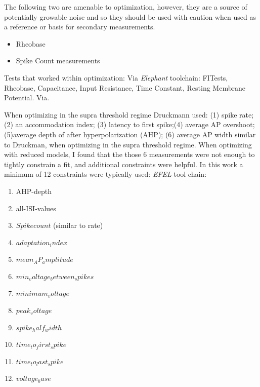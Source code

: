 The following two are amenable to optimization, however, they are a source of potentially growable noise and so they should be used with caution when used as a reference or basis for secondary measurements.
\begin{itemize}
\item Rheobase 
\item Spike Count measurements \end{itemize}



Tests that worked within optimization:
Via \emph{Elephant} toolchain: FITests, Rheobase, Capacitance, Input Resistance, Time Constant, Resting Membrane Potential.
Via. 

When optimizing in the supra threshold regime Druckmann used:
(1) spike rate; (2) an accommodation index; (3) latency to first spike;(4) average AP overshoot; (5)average depth of after hyperpolarization (AHP); 
(6) average AP width similar to Druckman, when optimizing in the supra threshold regime.
When optimizing with reduced models, I found that the those 6 measurements were not enough to tightly constrain a fit, and additional constraints were helpful. In this work a minimum of 12 constraints were typically used:
\emph{EFEL}
tool chain:
\begin{enumerate}
\item AHP-depth
\item all-ISI-values
\item $Spikecount$ (similar to rate)
\item $adaptation_index$
\item $mean_AP_amplitude$
\item $min_voltage_between_spikes$
\item $minimum_voltage$
\item $peak_voltage$
\item $spike_half_width$
\item $time_to_first_spike$
\item $time_to_last_spike$
\item $voltage_base$
\end{enumerate}
